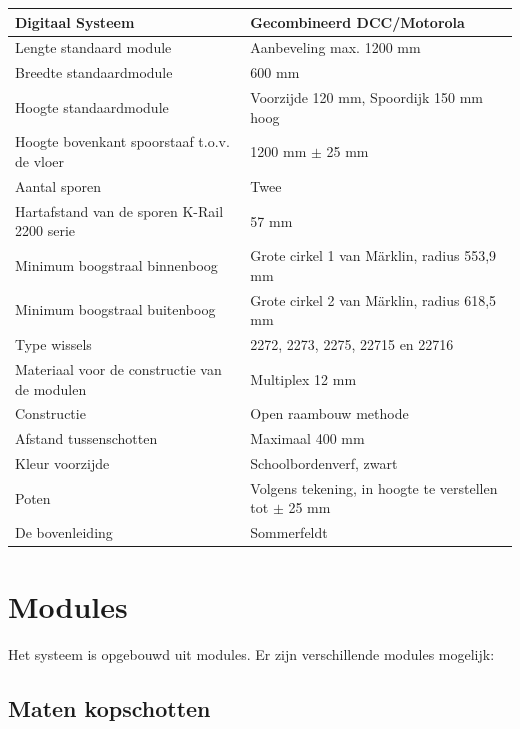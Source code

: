 \documentclass[12pt,a4paper]{report}
\newcommand*{\marklin}{M\"{a}rklin}
\begin{document}
\begin{tabular}{| l |p{7cm}|}
\hline
\cellcolor[gray]{0.84}Digitaal Systeem & Gecombineerd DCC/Motorola\\
\hline
\cellcolor[gray]{0.84}Lengte standaard module & Aanbeveling max. 1200 mm\\
\hline
\cellcolor[gray]{0.84}Breedte standaardmodule & 600 mm\\
\hline
\cellcolor[gray]{0.84}Hoogte standaardmodule & Voorzijde 120 mm, Spoordijk 150 mm hoog\\
\hline
\cellcolor[gray]{0.84}Hoogte bovenkant spoorstaaf t.o.v. de vloer&1200 mm $\pm$ 25 mm\\
\hline
\cellcolor[gray]{0.84}Aantal sporen&Twee\\
\hline
\cellcolor[gray]{0.84}Hartafstand van de sporen K-Rail 2200 serie&57 mm\\
\hline
\cellcolor[gray]{0.84}Minimum boogstraal binnenboog&Grote cirkel 1 van \marklin, radius 553,9 mm\\
\hline
\cellcolor[gray]{0.84}Minimum boogstraal buitenboog&Grote cirkel 2 van \marklin, radius 618,5 mm\\
\hline
\cellcolor[gray]{0.84}Type wissels&2272, 2273, 2275, 22715 en 22716\\
\hline
\cellcolor[gray]{0.84}Materiaal voor de constructie van de modulen&Multiplex 12 mm\\
\hline
\cellcolor[gray]{0.84}Constructie&Open raambouw methode\\
\hline
\cellcolor[gray]{0.84}Afstand tussenschotten&Maximaal 400 mm\\
\hline
\cellcolor[gray]{0.84}Kleur voorzijde&Schoolbordenverf, zwart\\
\hline
\cellcolor[gray]{0.84}Poten&Volgens tekening, in hoogte te verstellen tot $\pm$ 25 mm\\
\hline
\cellcolor[gray]{0.84}De bovenleiding&Sommerfeldt\\
\hline
\end{tabular}

\chapter{Modules}
\label{ch:modules}
Het systeem is opgebouwd uit modules. Er zijn verschillende modules mogelijk:

\section{Maten kopschotten}
\end{document}
